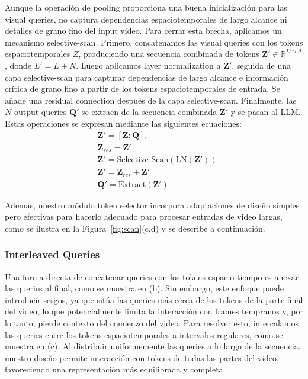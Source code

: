 Aunque la operación de pooling proporciona una buena inicialización para las visual queries, no captura dependencias espaciotemporales de largo alcance ni detalles de grano fino del input video. Para cerrar esta brecha, aplicamos un mecanismo selective-scan. Primero, concatenamos las visual queries con los tokens espaciotemporales $Z$, produciendo una secuencia combinada de tokens $\mathbf{Z'} \in \mathbb{R}^{L' \times d}$, donde $L' = L + N$. Luego aplicamos layer normalization a $\mathbf{Z'}$, seguida de una capa selective-scan para capturar dependencias de largo alcance e información crítica de grano fino a partir de los tokens espaciotemporales de entrada. Se añade una residual connection después de la capa selective-scan. Finalmente, las $N$ output queries $\mathbf{Q'}$ se extraen de la secuencia combinada $\mathbf{Z'}$ y se pasan al LLM. Estas operaciones se expresan mediante las siguientes ecuaciones:
\begin{equation}
    \begin{aligned}
    &\mathbf{Z'} = [\mathbf{Z}; \mathbf{Q}], \\
    &\mathbf{Z}_{res} = \mathbf{Z'} \\
    &\mathbf{Z'} = \text{Selective-Scan}(\text{LN}(\mathbf{Z'})) \\
    &\mathbf{Z'} = \mathbf{Z}_{res} + \mathbf{Z'}\\
    &\mathbf{Q'} = \text{Extract}(\mathbf{Z'})
    \end{aligned}
\end{equation}

Además, nuestro módulo token selector incorpora adaptaciones de diseño simples pero efectivas para hacerlo adecuado para procesar entradas de video largas, como se ilustra en la Figura~\ref{fig:scan}(c,d) y se describe a continuación.

\subsubsection{Interleaved Queries} Una forma directa de concatenar queries con los tokens espacio-tiempo es anexar las queries al final, como se muestra en (b). Sin embargo, este enfoque puede introducir sesgos, ya que sitúa las queries más cerca de los tokens de la parte final del video, lo que potencialmente limita la interacción con frames tempranos y, por lo tanto, pierde contexto del comienzo del video. Para resolver esto, intercalamos las queries entre los tokens espaciotemporales a intervalos regulares, como se muestra en (c). Al distribuir uniformemente las queries a lo largo de la secuencia, nuestro diseño permite interacción con tokens de todas las partes del video, favoreciendo una representación más equilibrada y completa.

